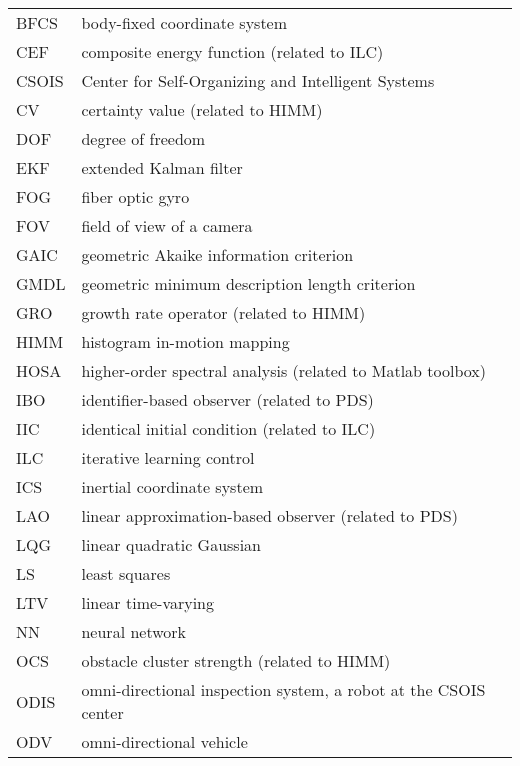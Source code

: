 %
%
%
%

\begin{acronyms}

\renewcommand{\arraystretch}{1.5}
\setlength{\tabcolsep}{3mm}
{\begin {tabular}{ll}
BFCS & body-fixed coordinate system\\
CEF   &composite energy function (related to ILC)\\
CSOIS &Center for Self-Organizing and Intelligent Systems\\
CV    &certainty value (related to HIMM)\\
DOF   &degree of freedom\\
EKF   &extended Kalman filter\\
FOG   &fiber optic gyro\\
FOV &field of view of a camera\\
GAIC &geometric Akaike information criterion\\
GMDL &geometric minimum description length criterion\\
GRO &growth rate operator (related to HIMM)\\
HIMM &histogram in-motion mapping\\
HOSA &higher-order spectral analysis (related to Matlab toolbox)\\
IBO &identifier-based observer (related to PDS)\\
IIC &identical initial condition (related to ILC)\\
ILC &iterative learning control\\
ICS &inertial coordinate system\\
LAO &linear approximation-based observer (related to PDS)\\
LQG &linear quadratic Gaussian\\
LS &least squares\\
LTV &linear time-varying\\
NN &neural network\\
OCS &obstacle cluster strength (related to HIMM)\\
ODIS &omni-directional inspection system, a robot at the CSOIS center\\
ODV &omni-directional vehicle\\
\end {tabular}}

\end{acronyms}
